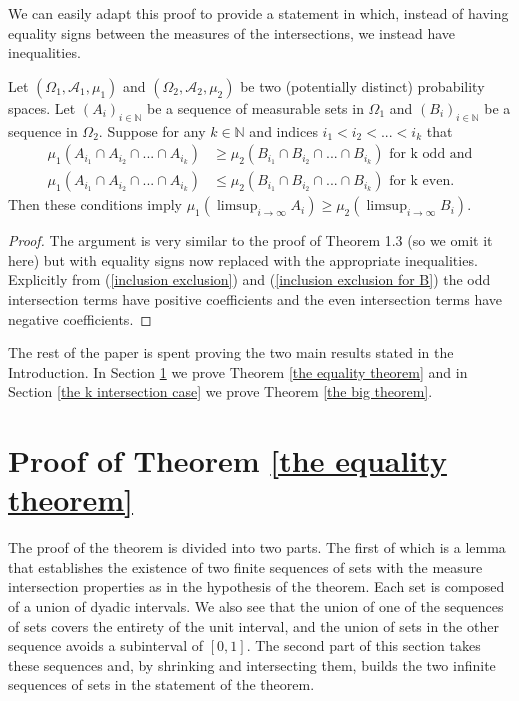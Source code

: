 \documentclass[12pt]{article}
\begin{document}
We can easily adapt this proof to provide a statement in which, instead of having equality signs between the measures of the intersections, we instead have inequalities. 

\begin{theorem} \label{fix everything inequality}
     Let $(\Omega_1, \mathscr{A}_1, \mu_1)$ and  $(\Omega_2, \mathscr{A}_2, \mu_2)$ be two (potentially distinct) probability spaces. Let $(A_i)_{i\in \mathbb{N}}$ be a sequence of measurable sets in $\Omega_1$ and $(B_i)_{i\in \mathbb{N}}$ be a sequence in $\Omega_2$. Suppose for any $k \in \mathbb{N}$ and indices $i_1<i_2<...<i_k$ that
     \begin{align*}
         \mu_1 (A_{i_1} \cap A_{i_2} \cap ... \cap A_{i_k}) &\geq \mu_2 (B_{i_1} \cap B_{i_2} \cap ... \cap B_{i_k}) \text{ for k odd and} \\
         \mu_1 (A_{i_1} \cap A_{i_2} \cap ... \cap A_{i_k}) &\leq \mu_2 (B_{i_1} \cap B_{i_2} \cap ... \cap B_{i_k}) \text{ for k even.}
     \end{align*}
     Then these conditions imply $\mu_1(\limsup_{i \rightarrow \infty} A_i) \geq \mu_2 (\limsup_{i \rightarrow \infty} B_i)$.
\end{theorem}

\begin{proof}
    The argument is very similar to the proof of Theorem 1.3 (so we omit it here) but with equality signs now replaced with the appropriate inequalities. Explicitly from (\ref{inclusion exclusion}) and (\ref{inclusion exclusion for B}) the odd intersection terms have positive coefficients and the even intersection terms have negative coefficients.
\end{proof}


The rest of the paper is spent proving the two main results stated in the Introduction. In Section \ref{equality proof section} we prove Theorem \ref{the equality theorem} and in Section \ref{the k intersection case} we prove Theorem \ref{the big theorem}. 




\section{Proof of Theorem \ref{the equality theorem}}\label{equality proof section}
The proof of the theorem is divided into two parts. The first of which is a lemma that establishes the existence of two finite sequences of sets with the measure intersection properties as in the hypothesis of the theorem. Each set is composed of a union of dyadic intervals. We also see that the union of one of the sequences of sets covers the entirety of the unit interval, and the union of sets in the other sequence avoids a subinterval of $[0,1]$. The second part of this section takes these sequences and, by shrinking and intersecting them, builds the two infinite sequences of sets in the statement of the theorem.
\end{document}
